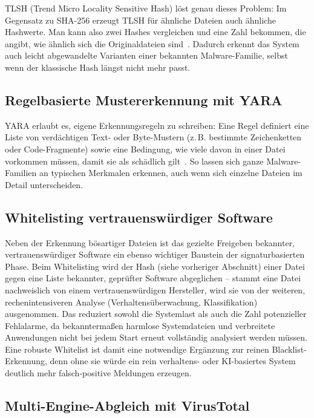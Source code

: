 \ac{TLSH} (Trend Micro Locality Sensitive Hash) löst genau dieses
Problem: Im Gegensatz zu \ac{SHA}-256 erzeugt \ac{TLSH} für ähnliche
Dateien auch ähnliche Hashwerte. Man kann also zwei Hashes vergleichen
und eine Zahl bekommen, die angibt, wie ähnlich sich die Originaldateien
sind~\cite{tlsh-paper}. Dadurch erkennt das System auch leicht
abgewandelte Varianten einer bekannten Malware-Familie, selbst wenn der
klassische Hash längst nicht mehr passt.

\subsection{Regelbasierte Mustererkennung mit YARA}

\ac{YARA} erlaubt es, eigene Erkennungsregeln zu schreiben: Eine Regel
definiert eine Liste von verdächtigen Text- oder Byte-Mustern (z.\,B.
bestimmte Zeichenketten oder Code-Fragmente) sowie eine Bedingung, wie
viele davon in einer Datei vorkommen müssen, damit sie als schädlich
gilt~\cite{yara-docs}. So lassen sich ganze Malware-Familien an
typischen Merkmalen erkennen, auch wenn sich einzelne Dateien im Detail
unterscheiden.

\subsection{Whitelisting vertrauenswürdiger Software}

Neben der Erkennung bösartiger Dateien ist das gezielte Freigeben
bekannter, vertrauenswürdiger Software ein ebenso wichtiger Baustein der
signaturbasierten Phase. Beim Whitelisting wird der Hash (siehe
vorheriger Abschnitt) einer Datei gegen eine Liste bekannter, geprüfter
Software abgeglichen -- stammt eine Datei nachweislich von einem
vertrauenswürdigen Hersteller, wird sie von der weiteren, rechenintensiveren
Analyse (Verhaltensüberwachung, Klassifikation) ausgenommen. Das reduziert
sowohl die Systemlast als auch die Zahl potenzieller Fehlalarme, da
bekanntermaßen harmlose Systemdateien und verbreitete Anwendungen nicht
bei jedem Start erneut vollständig analysiert werden müssen. Eine robuste
Whitelist ist damit eine notwendige Ergänzung zur reinen
Blacklist-Erkennung, denn ohne sie würde ein rein verhaltens- oder
KI-basiertes System deutlich mehr falsch-positive Meldungen erzeugen.

\subsection{Multi-Engine-Abgleich mit VirusTotal}

